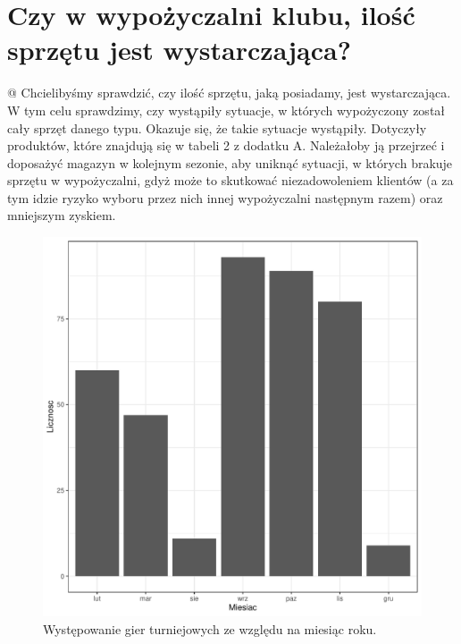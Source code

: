 \documentclass{mwart}\usepackage[]{graphicx}\usepackage[]{xcolor}
\makeatletter
\def\maxwidth{ %
  \ifdim\Gin@nat@width>\linewidth
    \linewidth
  \else
    \Gin@nat@width
  \fi
}
\newenvironment{knitrout}{}{} %
\makeatother
\begin{document}

\section{Czy w wypożyczalni klubu, ilość sprzętu jest wystarczająca? }

@
Chcielibyśmy sprawdzić, czy ilość sprzętu, jaką posiadamy, jest wystarczająca. W tym celu sprawdzimy, czy wystąpiły sytuacje, w których wypożyczony został cały sprzęt danego typu. Okazuje się, że takie sytuacje wystąpiły. Dotyczyły produktów, które znajdują się w tabeli 2 z dodatku A. Należałoby ją przejrzeć i doposażyć magazyn w kolejnym sezonie, aby uniknąć sytuacji, w których brakuje sprzętu w wypożyczalni, gdyż może to skutkować niezadowoleniem klientów (a za tym idzie ryzyko wyboru przez nich innej wypożyczalni następnym razem) oraz mniejszym zyskiem. 



\begin{knitrout}
\color{fgcolor}\begin{figure}
\includegraphics[width=\maxwidth]{figure/tournaments-1} \caption[Występowanie gier turniejowych ze względu na miesiąc roku]{Występowanie gier turniejowych ze względu na miesiąc roku.}\label{fig:tournaments}
\end{figure}

\end{knitrout}
\end{document}
